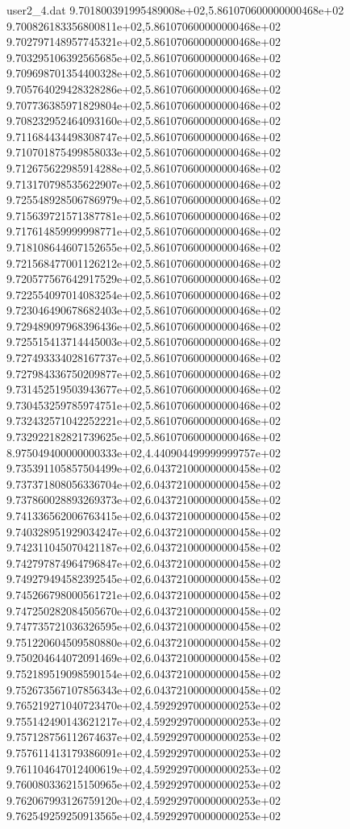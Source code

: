 \begin{filecontents}{user2_4.dat}
9.701800391995489008e+02,5.861070600000000468e+02
9.700826183356800811e+02,5.861070600000000468e+02
9.702797148957745321e+02,5.861070600000000468e+02
9.703295106392565685e+02,5.861070600000000468e+02
9.709698701354400328e+02,5.861070600000000468e+02
9.705764029428328286e+02,5.861070600000000468e+02
9.707736385971829804e+02,5.861070600000000468e+02
9.708232952464093160e+02,5.861070600000000468e+02
9.711684434498308747e+02,5.861070600000000468e+02
9.710701875499858033e+02,5.861070600000000468e+02
9.712675622985914288e+02,5.861070600000000468e+02
9.713170798535622907e+02,5.861070600000000468e+02
9.725548928506786979e+02,5.861070600000000468e+02
9.715639721571387781e+02,5.861070600000000468e+02
9.717614859999998771e+02,5.861070600000000468e+02
9.718108644607152655e+02,5.861070600000000468e+02
9.721568477001126212e+02,5.861070600000000468e+02
9.720577567642917529e+02,5.861070600000000468e+02
9.722554097014083254e+02,5.861070600000000468e+02
9.723046490678682403e+02,5.861070600000000468e+02
9.729489097968396436e+02,5.861070600000000468e+02
9.725515413714445003e+02,5.861070600000000468e+02
9.727493334028167737e+02,5.861070600000000468e+02
9.727984336750209877e+02,5.861070600000000468e+02
9.731452519503943677e+02,5.861070600000000468e+02
9.730453259785974751e+02,5.861070600000000468e+02
9.732432571042252221e+02,5.861070600000000468e+02
9.732922182821739625e+02,5.861070600000000468e+02
8.975049400000000333e+02,4.440904499999999757e+02
9.735391105857504499e+02,6.043721000000000458e+02
9.737371808056336704e+02,6.043721000000000458e+02
9.737860028893269373e+02,6.043721000000000458e+02
9.741336562006763415e+02,6.043721000000000458e+02
9.740328951929034247e+02,6.043721000000000458e+02
9.742311045070421187e+02,6.043721000000000458e+02
9.742797874964796847e+02,6.043721000000000458e+02
9.749279494582392545e+02,6.043721000000000458e+02
9.745266798000561721e+02,6.043721000000000458e+02
9.747250282084505670e+02,6.043721000000000458e+02
9.747735721036326595e+02,6.043721000000000458e+02
9.751220604509580880e+02,6.043721000000000458e+02
9.750204644072091469e+02,6.043721000000000458e+02
9.752189519098590154e+02,6.043721000000000458e+02
9.752673567107856343e+02,6.043721000000000458e+02
9.765219271040723470e+02,4.592929700000000253e+02
9.755142490143621217e+02,4.592929700000000253e+02
9.757128756112674637e+02,4.592929700000000253e+02
9.757611413179386091e+02,4.592929700000000253e+02
9.761104647012400619e+02,4.592929700000000253e+02
9.760080336215150965e+02,4.592929700000000253e+02
9.762067993126759120e+02,4.592929700000000253e+02
9.762549259250913565e+02,4.592929700000000253e+02

\end{filecontents}
